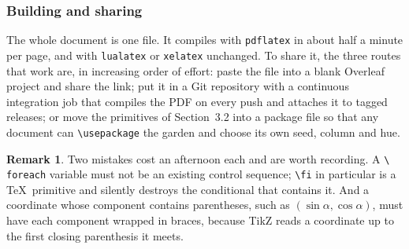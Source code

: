 \documentclass[11pt,a4paper]{article}
\theoremstyle{plain}
\theoremstyle{definition}
\newtheorem{remark}[proposition]{Remark}
\begin{document}
\subsubsection{Building and sharing}

The whole document is one file. It compiles with \texttt{pdflatex} in about half a
minute per page, and with \texttt{lualatex} or \texttt{xelatex} unchanged. To share it,
the three routes that work are, in increasing order of effort: paste the file into a blank
Overleaf project and share the link; put it in a Git repository with a continuous
integration job that compiles the PDF on every push and attaches it to tagged releases;
or move the primitives of Section~3.2 into a package file so that any document can
\texttt{\textbackslash usepackage} the garden and choose its own seed, column and hue.

\begin{remark}
Two mistakes cost an afternoon each and are worth recording. A \texttt{\textbackslash
foreach} variable must not be an existing control sequence; \texttt{\textbackslash fi}
in particular is a \TeX\ primitive and silently destroys the conditional that contains it.
And a coordinate whose component contains parentheses, such as $(\sin\alpha,\cos\alpha)$,
must have each component wrapped in braces, because TikZ reads a coordinate up to the
first closing parenthesis it meets.
\end{remark}
\end{document}
